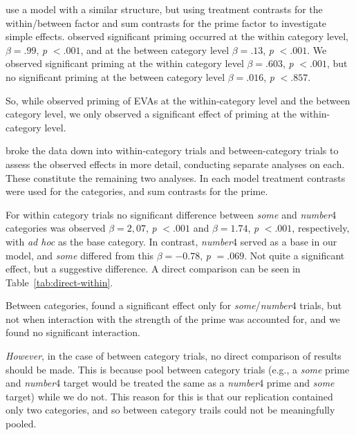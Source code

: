 \documentclass[10pt]{article}
\begin{document}
\begin{multicols}{2}
\citeauthor{Bott:2016aa} use a model with a similar structure, but using treatment contrasts for the within/between factor and sum contrasts for the prime factor to investigate simple effects.
\citeauthor{Bott:2016aa} observed significant priming occurred at the within category level, \(\beta = .99\), \emph{p} \(< .001\), and at the between category level \(\beta = .13\), \emph{p} \(< .001\).
We observed significant priming at the within category level \(\beta = .603\), \emph{p} \(<.001\), but no significant priming at the between category level \(\beta = .016\), \emph{p} \(< .857\).

So, while \citeauthor{Bott:2016aa} observed priming of EVAs at the within-category level and the between category level, we only observed a significant effect of priming at the within-category level.

\citeauthor{Bott:2016aa} broke the data down into within-category trials and between-category trials to assess the observed effects in more detail, conducting separate analyses on each.
These constitute the remaining two analyses.
In each model treatment contrasts were used for the categories, and sum contrasts for the prime.

For within category trials no significant difference between \emph{some} and \emph{number}4 categories was observed \(\beta = 2,07\), \emph{p} \(< .001\) and \(\beta = 1.74\), \emph{p} \(< .001\), respectively, with \emph{ad hoc} as the base category.
In contrast, \emph{number}4 served as a base in our model, and \emph{some} differed from this \(\beta = -0.78\), \emph{p} \(= .069\).
Not quite a significant effect, but a suggestive difference.
A direct comparison can be seen in Table~\ref{tab:direct-within}.

Between categories, \citeauthor{Bott:2016aa} found a significant effect only for \emph{some}/\emph{number}4 trials, but not when interaction with the strength of the prime was accounted for, and we found no significant interaction.

\emph{However}, in the case of between category trials, no direct comparison of results should be made.
This is because \citeauthor{Bott:2016aa} pool between category trials (e.g., a \emph{some} prime and \emph{number}4 target would be treated the same as a \emph{number}4 prime and \emph{some} target) while we do not.
This reason for this is that our replication contained only two categories, and so between category trails could not be meaningfully pooled.


\end{multicols}
\end{document}
